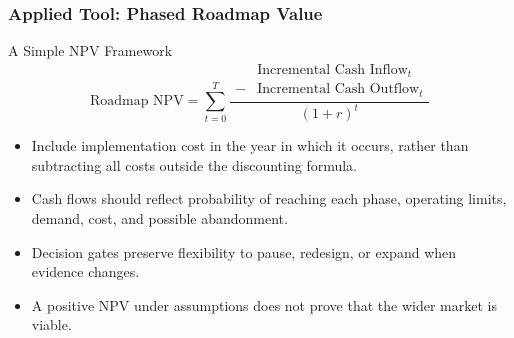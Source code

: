 \documentclass{beamer}
\begin{document}
\begin{frame}[t]
\frametitle{Applied Tool: Phased Roadmap Value}
\begin{block}{A Simple NPV Framework}
\[
\text{Roadmap NPV} = \sum_{t=0}^{T} \frac{
  \begin{aligned}
    & \text{Incremental Cash Inflow}_t \\
    {} - {} & \text{Incremental Cash Outflow}_t
  \end{aligned}
}{(1+r)^t}
\]
\end{block}
\begin{itemize}
\item Include implementation cost in the year in which it occurs, rather than subtracting all costs outside the discounting formula.
\item Cash flows should reflect probability of reaching each phase, operating limits, demand, cost, and possible abandonment.
\item Decision gates preserve flexibility to pause, redesign, or expand when evidence changes.
\item A positive NPV under assumptions does not prove that the wider market is viable.
\end{itemize}
\end{frame}
\end{document}
